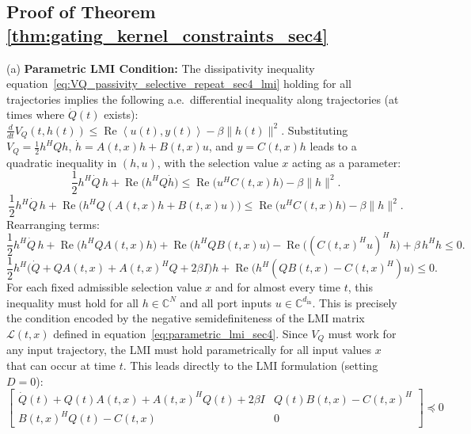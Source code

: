 \documentclass[10pt]{article} %
\def\eqref#1{equation~\ref{#1}}
\newcommand{\ip}[2]{\left\langle #1, #2 \right\rangle} %
\DeclareMathOperator{\realPart}{Re}                     %
\theoremstyle{definition}
\begin{document}
\subsection{Proof of Theorem \ref{thm:gating_kernel_constraints_sec4}}
\label{subsec:parametric_lmi}
(a) \textbf{Parametric LMI Condition:} The dissipativity inequality \eqref{eq:VQ_passivity_selective_repeat_sec4_lmi} holding for all trajectories implies the following a.e.\ differential inequality along trajectories (at times where $\dot Q(t)$ exists): $\frac{d}{dt} V_Q(t,h(t)) \le \realPart\ip{u(t)}{y(t)} - \beta \|h(t)\|^2$. Substituting $V_Q = \frac{1}{2} h^H Q h$, $\dot{h} = A(t,x)h + B(t,x)u$, and $y = C(t,x)h$ leads to a quadratic inequality in $(h,u)$, with the selection value $x$ acting as a parameter:
\begin{equation}
\frac{1}{2} h^H \dot{Q}\, h + \realPart\!\bigl(h^H Q \dot{h}\bigr)
\le \realPart\!\bigl(u^H C(t,x) h\bigr) - \beta \|h\|^2 .
\end{equation}
\begin{equation}
\frac{1}{2} h^H \dot{Q}\, h + \realPart\!\bigl(h^H Q (A(t,x)h + B(t,x)u)\bigr)
\le \realPart\!\bigl(u^H C(t,x) h\bigr) - \beta \|h\|^2 .
\end{equation}
Rearranging terms:
\begin{equation}
\frac{1}{2} h^H \dot{Q}\, h
+ \realPart\!\bigl(h^H Q A(t,x) h\bigr)
+ \realPart\!\bigl(h^H Q B(t,x) u\bigr)
- \realPart\!\bigl((C(t,x)^H u)^H h\bigr)
+ \beta\, h^H h
\le 0 .
\end{equation}
\begin{equation}
\frac{1}{2} h^H \!\bigl(\dot{Q} + Q A(t,x) + A(t,x)^H Q + 2\beta I\bigr) h
+ \realPart\!\bigl(h^H (Q B(t,x) - C(t,x)^H) u\bigr)
\le 0 .
\end{equation}
For each fixed admissible selection value $x$ and for almost every time $t$, this inequality must hold for all $h \in \mathbb{C}^N$ and all port inputs $u \in \mathbb{C}^{d_{\mathrm{in}}}$. This is precisely the condition encoded by the negative semidefiniteness of the LMI matrix $\mathcal{L}(t, x)$ defined in \eqref{eq:parametric_lmi_sec4}. Since $V_Q$ must work for any input trajectory, the LMI must hold parametrically for all input values $x$ that can occur at time $t$. This leads directly to the LMI formulation (setting $D=0$):
\begin{equation} \begin{bmatrix} \dot Q(t) + Q(t) A(t,x) + A(t,x)^H Q(t) + 2\beta I & Q(t) B(t,x) - C(t,x)^H \\ B(t,x)^H Q(t) - C(t,x) & 0 \end{bmatrix} \preceq 0 \end{equation}
\end{document}
